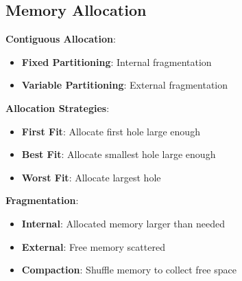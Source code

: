 \documentclass[12pt,a4paper]{report}
\begin{document}
\subsection{Memory Allocation}
\begin{concept}
\textbf{Contiguous Allocation}:
\begin{itemize}
    \item \textbf{Fixed Partitioning}: Internal fragmentation
    \item \textbf{Variable Partitioning}: External fragmentation
\end{itemize}

\textbf{Allocation Strategies}:
\begin{itemize}
    \item \textbf{First Fit}: Allocate first hole large enough
    \item \textbf{Best Fit}: Allocate smallest hole large enough
    \item \textbf{Worst Fit}: Allocate largest hole
\end{itemize}

\textbf{Fragmentation}:
\begin{itemize}
    \item \textbf{Internal}: Allocated memory larger than needed
    \item \textbf{External}: Free memory scattered
    \item \textbf{Compaction}: Shuffle memory to collect free space
\end{itemize}
\end{concept}
\end{document}
